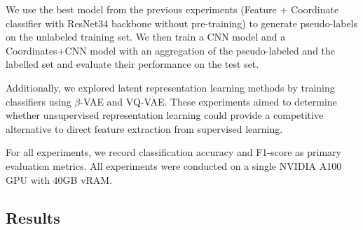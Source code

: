 \documentclass{article}
\begin{document}
We use the best model from the previous experiments (Feature + Coordinate
classifier with ResNet34 backbone without pre-training) to generate
pseudo-labels on the unlabeled training set. We then train a CNN model and a
Coordinates+CNN model with an aggregation of the pseudo-labeled and the
labelled set and evaluate their performance on the test set.

Additionally, we explored latent representation learning methods by training
classifiers using $\beta$-VAE and VQ-VAE. These experiments aimed to determine
whether unsupervised representation learning could provide a competitive
alternative to direct feature extraction from supervised learning.

For all experiments, we record classification accuracy and F1-score as primary
evaluation metrics. All experiments were conducted on a single NVIDIA A100 GPU
with 40GB vRAM.

\subsection{Results}
\end{document}
